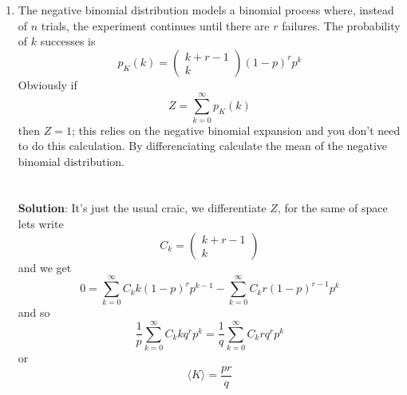 \documentclass[11pt,a4paper]{scrartcl}
\begin{document}
\begin{enumerate}
\item The negative binomial distribution models a binomial process
  where, instead of $n$ trials, the experiment continues until there
  are $r$ failures. The probability of $k$ successes is
  \begin{equation}
    p_K(k)=\left(\begin{array}{c}k+r-1\\k\end{array}\right)(1-p)^rp^k
  \end{equation}
Obviously if
  \begin{equation}
    Z=\sum_{k=0}^\infty p_K(k)
  \end{equation}
  then $Z=1$; this relies on the negative binomial expansion and
  you don't need to do this calculation. By differenciating calculate
  the mean of the negative binomial distribution.\\
\\ \\
\textbf{Solution}: It's just the usual craic, we differentiate $Z$, for the same of space lets write
\begin{equation}
  C_k=\left(\begin{array}{c}k+r-1\\k\end{array}\right)
\end{equation}
and we get
\begin{equation}
  0=\sum_{k=0}^\infty C_k k (1-p)^rp^{k-1}-\sum_{k=0}^\infty C_k r(1-p)^{r-1}p^k
\end{equation}
and so
\begin{equation}
  \frac{1}{p}\sum_{k=0}^\infty C_k k q^rp^k=\frac{1}{q}\sum_{k=0}^\infty C_k rq^rp^k
\end{equation}
or
\begin{equation}
  \langle K\rangle = \frac{pr}{q}
\end{equation}


\end{enumerate}
  
\end{document}
